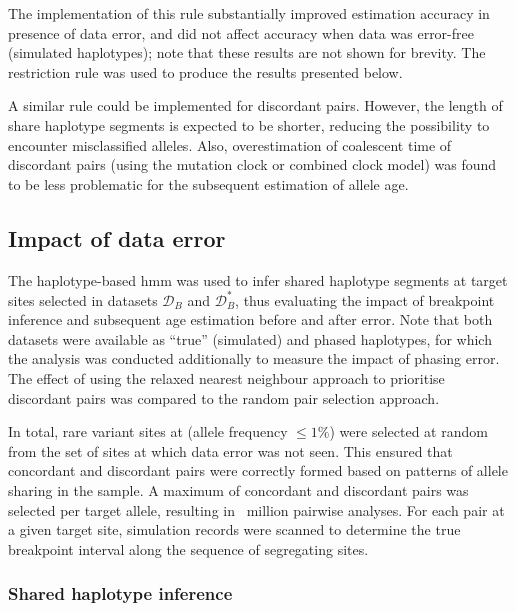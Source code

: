 The implementation of this rule substantially improved estimation accuracy in presence of data error, and did not affect accuracy when data was error-free (simulated haplotypes); note that these results are not shown for brevity.
The restriction rule was used to produce the results presented below.

A similar rule could be implemented for discordant pairs.
However, the length of share haplotype segments is expected to be shorter, reducing the possibility to encounter misclassified alleles.
Also, overestimation of coalescent time of discordant pairs (using the mutation clock or combined clock model) was found to be less problematic for the subsequent estimation of allele age.





%
\subsection{Impact of data error}\label{sec:hhmm_eval}
%

The haplotype-based \gls{hmm} was used to infer shared haplotype segments at target sites selected in datasets $\mathcal{D}_B$ and $\mathcal{D}_B^{\ast}$, thus evaluating the impact of breakpoint inference and subsequent age estimation before and after error.
Note that both datasets were available as ``true'' (simulated) and phased haplotypes, for which the analysis was conducted additionally to measure the impact of phasing error.
The effect of using the relaxed nearest neighbour approach to prioritise discordant pairs was compared to the random pair selection approach.

In total,  rare variant sites at \fk{[2,50]} (allele frequency ${\leq 1\%}$) were selected at random from the set of sites at which data error was not seen.
This ensured that concordant and discordant pairs were correctly formed based on patterns of allele sharing in the sample.
A maximum of  concordant and  discordant pairs was selected per target allele, resulting in ~million pairwise analyses.
For each pair at a given target site, simulation records were scanned to determine the true breakpoint interval along the sequence of segregating sites.


%

%


%
\subsubsection{Shared haplotype inference}
%

